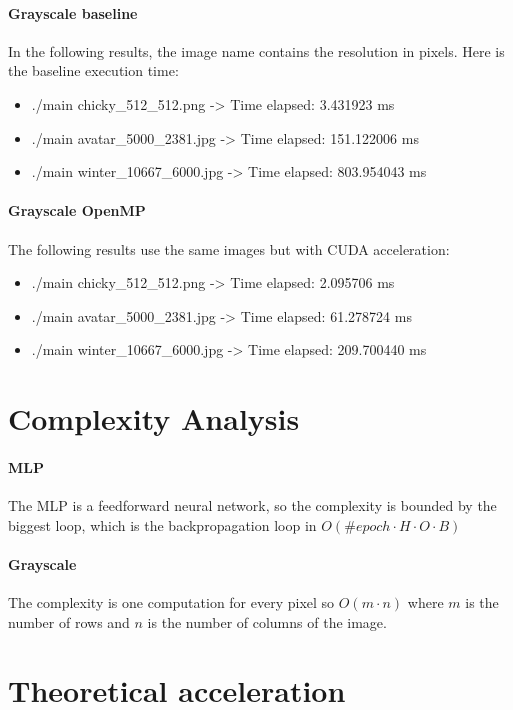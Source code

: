 \documentclass[11pt]{article}
\begin{document}
\paragraph*{Grayscale baseline} In the following results, the image name contains the resolution in pixels. Here is the baseline execution time:

\begin{itemize}
	\item ./main chicky\_512\_512.png -> Time elapsed: 3.431923 ms
	\item ./main avatar\_5000\_2381.jpg -> Time elapsed: 151.122006 ms
	\item ./main winter\_10667\_6000.jpg -> Time elapsed: 803.954043 ms
\end{itemize}

\paragraph*{Grayscale OpenMP} The following results use the same images but with CUDA acceleration:

\begin{itemize}
	\item	./main chicky\_512\_512.png -> Time elapsed: 2.095706 ms
	\item	./main avatar\_5000\_2381.jpg -> Time elapsed: 61.278724 ms
	\item	./main winter\_10667\_6000.jpg -> Time elapsed: 209.700440 ms
\end{itemize}

\section{Complexity Analysis}

\paragraph*{MLP} The MLP is a feedforward neural network, so the complexity is bounded by the biggest loop, which is the backpropagation loop in $O(\#epoch  \cdot H \cdot O \cdot B)$

\paragraph*{Grayscale} The complexity is one computation for every pixel so $O(m \cdot n )$ where $m$ is the number of rows and $n$ is the number of columns of the image.

\section{Theoretical acceleration}
\end{document}
